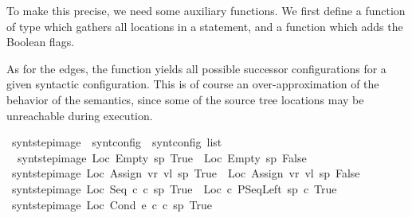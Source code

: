\begin{isabellebody}
\begin{isamarkuptext}
To make this precise, we need some auxiliary functions. We first define a
function  of type  which gathers all locations in a statement, and a function  which adds the Boolean flags.\end{isamarkuptext}\isamarkuptrue \begin{isamarkuptext}As for the edges, the function  yields all
possible successor configurations for a given syntactic configuration. This is of
course an over-approximation of the behavior of the semantics, since some of
the source tree locations may be unreachable during execution.\end{isamarkuptext}\isamarkuptrue {}\isamarkupfalse \ synt{\isacharunderscore}step{\isacharunderscore}image\ {\isacharcolon}{\isacharcolon}\ {\isachardoublequoteopen}synt{\isacharunderscore}config\ {\isasymRightarrow}\ synt{\isacharunderscore}config\ list{\isachardoublequoteclose}\ \isanewline
\ \ {\isachardoublequoteopen}synt{\isacharunderscore}step{\isacharunderscore}image\ {\isacharparenleft}Loc\ Empty\ sp{\isacharcomma}\ True{\isacharparenright}\ {\isacharequal}\ {\isacharbrackleft}{\isacharparenleft}Loc\ Empty\ sp{\isacharcomma}\ False{\isacharparenright}{\isacharbrackright}{\isachardoublequoteclose}\isanewline
{\isacharbar}\ {\isachardoublequoteopen}synt{\isacharunderscore}step{\isacharunderscore}image\ {\isacharparenleft}Loc\ {\isacharparenleft}Assign\ vr\ vl{\isacharparenright}\ sp{\isacharcomma}\ True{\isacharparenright}\ {\isacharequal}\ {\isacharbrackleft}{\isacharparenleft}Loc\ {\isacharparenleft}Assign\ vr\ vl{\isacharparenright}\ sp{\isacharcomma}\ False{\isacharparenright}{\isacharbrackright}{\isachardoublequoteclose}\isanewline
{\isacharbar}\ {\isachardoublequoteopen}synt{\isacharunderscore}step{\isacharunderscore}image\ {\isacharparenleft}Loc\ {\isacharparenleft}Seq\ c{}\ c{}{\isacharparenright}\ sp{\isacharcomma}\ True{\isacharparenright}\ {\isacharequal}\ {\isacharbrackleft}{\isacharparenleft}Loc\ c{}\ {\isacharparenleft}PSeqLeft\ sp\ c{}{\isacharparenright}{\isacharcomma}\ True{\isacharparenright}{\isacharbrackright}{\isachardoublequoteclose}\isanewline
{\isacharbar}\ {\isachardoublequoteopen}synt{\isacharunderscore}step{\isacharunderscore}image\ {\isacharparenleft}Loc\ {\isacharparenleft}Cond\ e\ c{}\ c{}{\isacharparenright}\ sp{\isacharcomma}\ True{\isacharparenright}\ {\isacharequal}\ \isanewline

\end{isabellebody}
